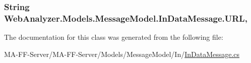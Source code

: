 \subsubsection[{U\+R\+L}]{\setlength{\rightskip}{0pt plus 5cm}String Web\+Analyzer.\+Models.\+Message\+Model.\+In\+Data\+Message.\+U\+R\+L\hspace{0.3cm}{\ttfamily [get]}, {\ttfamily [set]}}\label{class_web_analyzer_1_1_models_1_1_message_model_1_1_in_data_message_a16e5e70d5df3ff7cf9c32793809c9beb}


The documentation for this class was generated from the following file\+:\begin{DoxyCompactItemize}
\item 
M\+A-\/\+F\+F-\/\+Server/\+M\+A-\/\+F\+F-\/\+Server/\+Models/\+Message\+Model/\+In/\hyperlink{_in_data_message_8cs}{In\+Data\+Message.\+cs}\end{DoxyCompactItemize}

